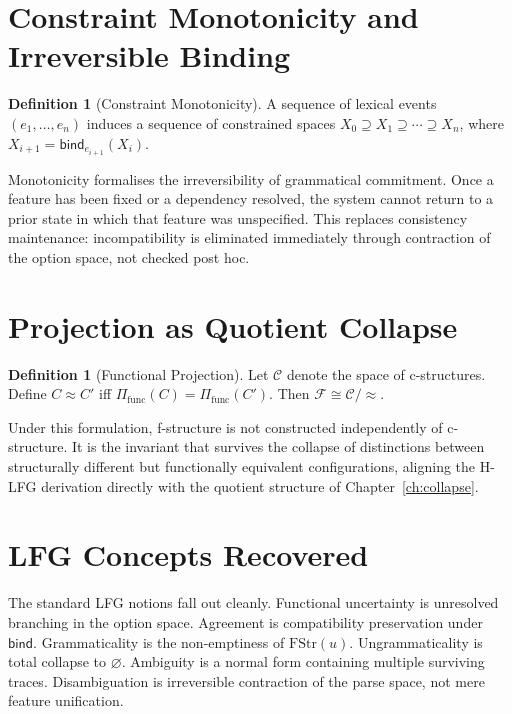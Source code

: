 \documentclass[12pt, oneside]{amsbook}
\theoremstyle{plain}
\theoremstyle{definition}
\newtheorem{definition}[theorem]{Definition}
\theoremstyle{remark}
\newcommand{\bind}{\mathsf{bind}}
\newcommand{\FStr}{\mathrm{FStr}}
\newcommand{\HLFGproj}{\Pi_{\mathrm{func}}}
\begin{document}
\section{Constraint Monotonicity and Irreversible Binding}
\label{sec:hlfg:monotonicity}

\begin{definition}[Constraint Monotonicity]
\label{def:monotonicity}
  A sequence of lexical events $(e_1, \dots, e_n)$ induces a sequence of
  constrained spaces $X_0 \supseteq X_1 \supseteq \cdots \supseteq X_n$,
  where $X_{i+1} = \bind_{e_{i+1}}(X_i)$.
\end{definition}

Monotonicity formalises the irreversibility of grammatical commitment. Once a
feature has been fixed or a dependency resolved, the system cannot return to a
prior state in which that feature was unspecified. This replaces consistency
maintenance: incompatibility is eliminated immediately through contraction of
the option space, not checked post hoc.

\section{Projection as Quotient Collapse}
\label{sec:hlfg:quotient}

\begin{definition}[Functional Projection]
\label{def:functional-projection}
  Let $\mathcal{C}$ denote the space of c-structures. Define
  $C \approx C'$ iff $\HLFGproj(C) = \HLFGproj(C')$.
  Then $\mathcal{F} \cong \mathcal{C}/{\approx}$.
\end{definition}

Under this formulation, f-structure is not constructed independently of
c-structure. It is the invariant that survives the collapse of distinctions
between structurally different but functionally equivalent configurations,
aligning the H-LFG derivation directly with the quotient structure of
Chapter~\ref{ch:collapse}.

\section{LFG Concepts Recovered}
\label{sec:hlfg:recovery}

The standard LFG notions fall out cleanly. Functional uncertainty is unresolved
branching in the option space. Agreement is compatibility preservation under
$\bind$. Grammaticality is the non-emptiness of $\FStr(u)$.
Ungrammaticality is total collapse to $\varnothing$. Ambiguity is a normal
form containing multiple surviving traces. Disambiguation is irreversible
contraction of the parse space, not mere feature unification.
\end{document}
